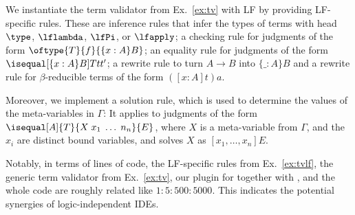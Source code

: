 \begin{example}\label{ex:tvlf}
	We instantiate the term validator from Ex.~\ref{ex:tv} with LF by providing LF-specific rules.
	These are inference rules that infer the types of terms with head $\type$, $\lflambda$, $\lfPi$, or $\lfapply$; a checking rule for judgments of the form $\oftype{T}{f}{\{x:A\}B}$; an equality rule for judgments of the form $\isequal[\{x:A\}B]{T}{t}{t'}$; a rewrite rule to turn $A\to B$ into $\{\_:A\}B$ and a rewrite rule for $\beta$-reducible terms of the form $([x:A]t)a$.
	
	Moreover, we implement a solution rule, which is used to determine the values of the meta-variables in $\Gamma$: It applies to judgments of the form $\isequal[A]{T}{X\;x_1\;\ldots\;n_n}{E}$, where $X$ is a meta-variable from $\Gamma$, and the $x_i$ are distinct bound variables, and solves $X$ as $[x_1,\ldots,x_n]E$.
\end{example}

Notably, in terms of lines of code, the LF-specific rules from Ex.~\ref{ex:tvlf}, the generic term validator from Ex.~\ref{ex:tv}, our plugin for \jedit together with \mmt, and the whole \jedit code are roughly related like $1:5:500:5000$.
This indicates the potential synergies of logic-independent IDEs.
	